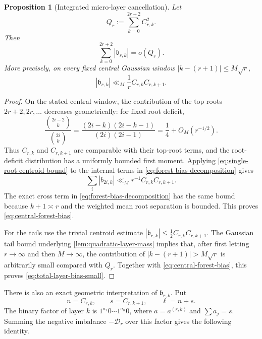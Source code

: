 \documentclass[11pt]{article}
\newtheorem{proposition}[theorem]{Proposition}
\theoremstyle{definition}
\theoremstyle{remark}
\begin{document}
\begin{proposition}[Integrated micro-layer cancellation]
\label{prop:integrated-microlayer-cancellation}
Let
\[
 Q_r:=\sum_{k=0}^{2r+2}C_{r,k}^2.
\]
Then
\begin{equation}
 {
 \sum_{k=0}^{2r+2}|\mathfrak b_{r,k}|=o(Q_r).
 }
 \label{eq:total-layer-bias-small}
\end{equation}
More precisely, on every fixed central Gaussian window
\(|k-(r+1)|\le M\sqrt r\),
\begin{equation}
 |\mathfrak b_{r,k}|
 \ll_M \frac1r C_{r,k}C_{r,k+1}.
 \label{eq:central-forest-bias}
\end{equation}
\end{proposition}

\begin{proof}
On the stated central window, the contribution of the top roots
\(2r+2,2r,\ldots\) decreases geometrically: for fixed root deficit,
\[
 \frac{\binom{2i-2}{k}}{\binom{2i}{k}}
 =\frac{(2i-k)(2i-k-1)}{(2i)(2i-1)}
 =\frac14+O_M(r^{-1/2}).
\]
Thus \(C_{r,k}\) and \(C_{r,k+1}\) are comparable with their top-root
terms, and the root-deficit distribution has a uniformly bounded first
moment.  Applying \eqref{eq:single-root-centroid-bound} to the internal
terms in \eqref{eq:forest-bias-decomposition} gives
\[
 \sum_i|b_{2i,k}|
 \ll_M r^{-1}C_{r,k}C_{r,k+1}.
\]
The exact cross term in \eqref{eq:forest-bias-decomposition} has the same
bound because \(k+1\asymp r\) and the weighted mean root separation is
bounded.  This proves \eqref{eq:central-forest-bias}.

For the tails use the trivial centroid estimate
\(|\mathfrak b_{r,k}|\le \tfrac12 C_{r,k}C_{r,k+1}\).  The Gaussian tail
bound underlying \cref{lem:quadratic-layer-mass} implies that, after first
letting \(r\to\infty\) and then \(M\to\infty\), the contribution of
\(|k-(r+1)|>M\sqrt r\) is arbitrarily small compared with \(Q_r\).
Together with \eqref{eq:central-forest-bias}, this proves
\eqref{eq:total-layer-bias-small}.
\end{proof}

There is also an exact geometric interpretation of
\(\mathfrak b_{r,k}\).  Put
\[
 n=C_{r,k},\qquad s=C_{r,k+1},\qquad \ell=n+s.
\]
The binary factor of layer \(k\) is
\(1^{a_1}0\cdots1^{a_n}0\), where
\(a=a^{(r,k)}\) and \(\sum a_j=s\).  Summing the negative imbalance
\(-\mathscr D_r\) over this factor gives the following identity.
\end{document}
